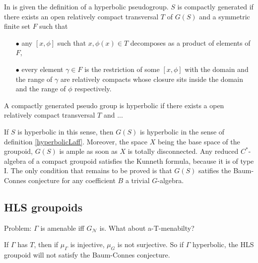 In \cite{nekrashevych} is given the definition of a hyperbolic pseudogroup. $S$ is compactly generated if there exists an open relatively compact transversal $T$ of $G(S)$ and a symmetric finite set $F$ such that
\begin{itemize}
\item[$\bullet$] any $[x,\phi]$ such that $x, \phi(x)\in T$ decomposes as a product of elements of $F$,
\item[$\bullet$] every element $\gamma \in F$ is the restriction of some $[x,\phi]$ with the domain and the range of $\gamma $ are relatively compacts whose closure sits inside the domain and the range of $\phi$ respectively. 
\end{itemize}

\begin{definition}
A compactly generated pseudo group is hyperbolic if there exists a open relatively compact transversal $T$ and ...
\end{definition}

If $S$ is hyperbolic in this sense, then $G(S)$ is hyperbolic in the sense of definition \ref{hyperbolicLaff}. Moreover, the space $X$ being the base space of the groupoid, $G(S)$ is ample as soon as $X$ is totally disconnected. Any reduced $C^*$-algebra of a compact groupoid satisfies the Kunneth formula, because it is of type I. The only condition that remains to be proved is that $G(S)$ satifies the Baum-Connes conjecture for any coefficient $B$ a trivial $G$-algebra.  

\subsection{HLS groupoids}

Problem: $\Gamma$ is amenable iff $G_{\mathcal N}$ is. What about a-T-menabilty?

If $\Gamma $ has $T$, then if $\mu_\Gamma$ is injective, $\mu_G  $ is not surjective. So if $\Gamma$ hyperbolic, the HLS groupoid will not satisfy the Baum-Connes conjecture.
























